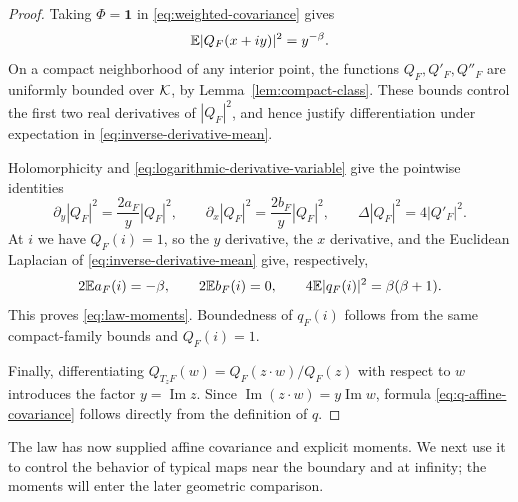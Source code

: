 \begin{proof}
Taking $\Phi=\mathbf 1$ in \eqref{eq:weighted-covariance} gives
\begin{equation}
 \mathbb E|Q_F(x+iy)|^2=y^{-\beta}.
 \label{eq:inverse-derivative-mean}
\end{equation}
On a compact neighborhood of any interior point, the functions
$Q_F,Q'_F,Q''_F$ are uniformly bounded over $\mathcal K$, by
Lemma~\ref{lem:compact-class}.  These bounds control the first two real
derivatives of $|Q_F|^2$, and hence justify differentiation under expectation
in \eqref{eq:inverse-derivative-mean}.

Holomorphicity and \eqref{eq:logarithmic-derivative-variable} give the
pointwise identities
\[
 \partial_y|Q_F|^2=\frac{2a_F}{y}|Q_F|^2,
 \qquad
 \partial_x|Q_F|^2=\frac{2b_F}{y}|Q_F|^2,
 \qquad
 \Delta|Q_F|^2=4|Q'_F|^2.
\]
At $i$ we have $Q_F(i)=1$, so the $y$ derivative, the $x$ derivative, and
the Euclidean Laplacian of \eqref{eq:inverse-derivative-mean} give,
respectively,
\[
 2\mathbb E a_F(i)=-\beta,
 \qquad 2\mathbb E b_F(i)=0,
 \qquad 4\mathbb E|q_F(i)|^2=\beta(\beta+1).
\]
This proves \eqref{eq:law-moments}.  Boundedness of $q_F(i)$ follows from
the same compact-family bounds and $Q_F(i)=1$.

Finally, differentiating
$Q_{T_zF}(w)=Q_F(z\cdot w)/Q_F(z)$ with respect to $w$ introduces the factor
$y=\operatorname{Im}z$.  Since
$\operatorname{Im}(z\cdot w)=y\operatorname{Im}w$, formula
\eqref{eq:q-affine-covariance} follows directly from the definition of $q$.
\end{proof}

The law has now supplied affine covariance and explicit moments.
We next use it to control the behavior of typical maps near the boundary
and at infinity; the moments will enter the later geometric comparison.
